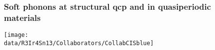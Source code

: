 



\begin{frame}[plain,label=Conc]
\frametitle {Soft phonons at structural qcp and in quasiperiodic materials}
\texttt{[image: \\data/R3Ir4Sn13/Collaborators/CollabCISblue]}
\end{frame}


